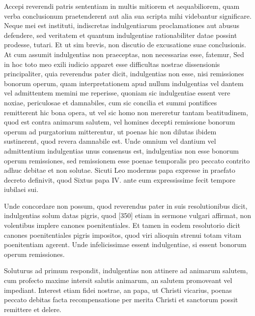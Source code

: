 Accepi reverendi patris sententiam in multis mitiorem et aequabiliorem, quam verba conclusionum praetenderent aut alia sua scripta mihi videbantur significare. Neque mei est instituti, indiscretas indulgentiarum proclamationes aut abusus defendere, sed veritatem et quantum indulgentiae rationabiliter datae possint prodesse, tutari. Et ut sim brevis, non discutio de excusatione suae conclusionis. At cum assumit indulgentias non praeceptas, non necessarias esse, fatemur, Sed in hoc toto meo exili iudicio apparet esse difficultas nostrae dissensionis principaliter, quia reverendus pater dicit, indulgentias non esse, nisi remissiones bonorum operum, quam interpretationem apud nullum indulgentias vel dantem vel admittentem memini me reperisse, quoniam sic indulgentiae essent vere noxiae, periculosae et damnabiles, cum sic concilia et summi pontifices remitterent hic bona opera, ut vel sic homo non mereretur tantam beatitudinem, quod est contra animarum salutem, vel homines decepti remissione bonorum operum ad purgatorium mitterentur, ut poenas hic non dilutas ibidem sustinerent, quod revera damnabile est. Unde omnium vel dantium vel admittentium indulgentias unus consensus est, indulgentias non esse bonorum operum remissiones, sed remissionem esse poenae temporalis pro peccato contrito adhuc debitae et non solutae. Sicuti Leo modernus papa expresse in praefato decreto definivit, quod Sixtus papa IV. ante eum expressissime fecit tempore iubilaei sui.

Unde concordare non possum, quod reverendus pater in suis resolutionibus dicit, indulgentias solum datas pigris, quod [350] etiam in sermone vulgari affirmat, non volentibus implere canones poenitentiales. Et tamen in eodem resolutorio dicit canones poenitentiales pigris impositos, quod viri alioquin strenui totam vitam poenitentiam agerent. Unde infelicissimae essent indulgentiae, si essent bonorum operum remissiones.

Soluturus ad primum respondit, indulgentias non attinere ad animarum salutem, cum profecto maxime intersit salutis animarum, an salutem promoveant vel impediant. Interest etiam fidei nostrae, an papa, ut Christi vicarius, poenas peccato debitas facta recompensatione per merita Christi et sanctorum possit remittere et delere.

